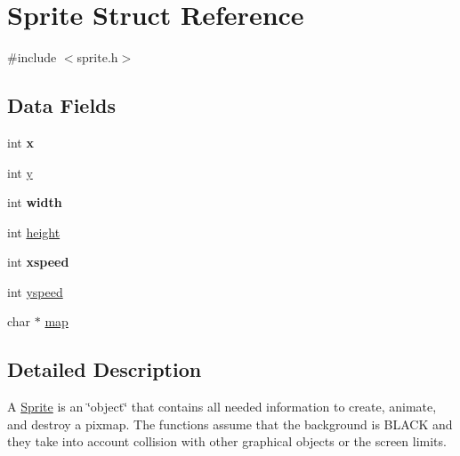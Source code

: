 \hypertarget{struct_sprite}{\section{Sprite Struct Reference}
\label{struct_sprite}
}


{\ttfamily \#include $<$sprite.\-h$>$}

\subsection*{Data Fields}
\begin{DoxyCompactItemize}
\item 
\hypertarget{struct_sprite_a6150e0515f7202e2fb518f7206ed97dc}{int {\bfseries x}}\label{struct_sprite_a6150e0515f7202e2fb518f7206ed97dc}

\item 
int \hyperlink{struct_sprite_a0a2f84ed7838f07779ae24c5a9086d33}{y}
\item 
\hypertarget{struct_sprite_a2474a5474cbff19523a51eb1de01cda4}{int {\bfseries width}}\label{struct_sprite_a2474a5474cbff19523a51eb1de01cda4}

\item 
int \hyperlink{struct_sprite_ad12fc34ce789bce6c8a05d8a17138534}{height}
\item 
\hypertarget{struct_sprite_a90b9d56e145baae469f7b6bb757d9b27}{int {\bfseries xspeed}}\label{struct_sprite_a90b9d56e145baae469f7b6bb757d9b27}

\item 
int \hyperlink{struct_sprite_a8e19090b4aa5dd9bb43efe8b74488f6d}{yspeed}
\item 
char $\ast$ \hyperlink{struct_sprite_a7b00b1bfd666e26484471bd17a74eaa9}{map}
\end{DoxyCompactItemize}


\subsection{Detailed Description}
A \hyperlink{struct_sprite}{Sprite} is an \char`\"{}object\char`\"{} that contains all needed information to create, animate, and destroy a pixmap. The functions assume that the background is B\-L\-A\-C\-K and they take into account collision with other graphical objects or the screen limits. 

